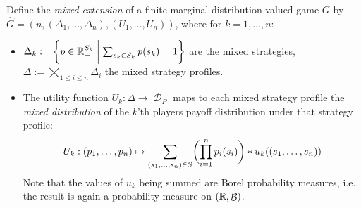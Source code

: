 \documentclass[a4paper]{scrreprt}
\DeclareMathOperator{\D}{\mathcal{D}}
\DeclareMathOperator{\B}{\mathcal{B}}
\newcommand{\Rp}{\mathbb{R}_+}
\begin{document}
    \begin{defn}
        Define the \emph{mixed extension} of a finite marginal-distribution-valued game $G$ by $\hat{G} = (n, (\Delta_1, \dots, \Delta_n), (U_1, \dots, U_n))$,
        where for $k = 1,\dots,n$:        
        \begin{itemize} %
            \item $\Delta_k := \biggset{ p \in \Rp^{S_k} \biggmid \sum_{s_k \in S_k} p(s_k) = 1 } $ are the mixed strategies, $\Delta := \bigtimes\limits_{1\leq i \leq n} \Delta_i$ the mixed strategy profiles.
            
            \item
            The utility function $U_k: \Delta \to \D_P$ maps to each mixed strategy profile the \emph{mixed distribution} of the $k$'th players payoff distribution under that strategy profile:
            \begin{gather}
                U_k: 
                (p_1, \dots, p_n) 
                \mapsto
                \sum_{(s_1, \dots, s_n) \in S} \biggl(\prod_{i=1}^{n} p_i(s_i)\biggr) * u_k( (s_1, \dots, s_n) )
                \label{eq:marginalDistMixedStrategyUtility}
            \end{gather}
            Note that the values of $u_k$ being summed are Borel probability measures, i.e. the result is again a probability measure on $(\R, \B)$.
        \end{itemize}
    \end{defn}
\end{document}
